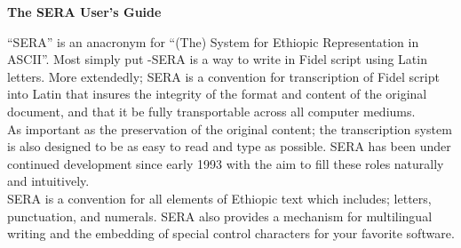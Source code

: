 \centerline{\LARGE\bf The SERA User's Guide} 

\vspace{0.4in}
``SERA'' is an anacronym for ``(The) System for Ethiopic Representation in ASCII''. Most 
simply put -SERA is a way to write in Fidel script using Latin letters. More 
extendedly; SERA is a convention for transcription of Fidel script into Latin that 
insures the integrity of the format and content of the original document, and that 
it be fully transportable across all computer mediums.  \\

As important as the preservation of the original content; the transcription system 
is also designed to be as easy to read and type as possible. SERA has been under 
continued development since early 1993 with the aim to fill these roles naturally 
and intuitively. \\

SERA is a convention for all elements of Ethiopic text which includes; letters, punctuation, and numerals.
SERA also provides a mechanism for multilingual writing and the embedding of special control characters for
your favorite software. \\
